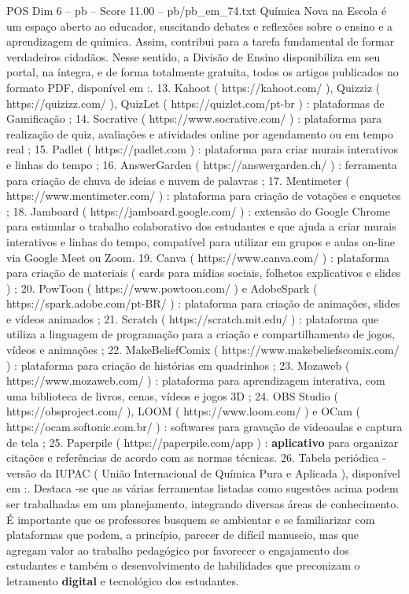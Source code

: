\begin{textsample}{POS Dim 6 – pb – Score 11.00 – pb/pb\_em\_74.txt}
Química Nova na Escola é um espaço aberto ao educador, suscitando debates e reflexões sobre o ensino e a aprendizagem de química.
Assim, contribui para a tarefa fundamental de formar verdadeiros cidadãos.
Nesse sentido, a Divisão de Ensino disponibiliza em seu portal, na íntegra, e de forma totalmente gratuita, todos os artigos publicados no formato PDF, disponível em :. 13.
Kahoot ( https://kahoot.com/ ), Quizziz ( https://quizizz.com/ ), QuizLet ( https://quizlet.com/pt-br ) : plataformas de Gamificação ; 14.
Socrative ( https://www.socrative.com/ ) : plataforma para realização de quiz, avaliações e atividades online por agendamento ou em tempo real ; 15.
Padlet ( https://padlet.com ) : plataforma para criar murais interativos e linhas do tempo ; 16.
AnswerGarden ( https://answergarden.ch/ ) : ferramenta para criação de chuva de ideias e nuvem de palavras ; 17.
Mentimeter ( https://www.mentimeter.com/ ) : plataforma para criação de votações e enquetes ; 18.
Jamboard ( https://jamboard.google.com/ ) : extensão do Google Chrome para estimular o trabalho colaborativo dos estudantes e que ajuda a criar murais interativos e linhas do tempo, compatível para utilizar em grupos e aulas on-line via Google Meet ou Zoom. 19.
Canva ( https://www.canva.com/ ) : plataforma para criação de materiais ( cards para mídias sociais, folhetos explicativos e slides ) ; 20.
PowToon ( https://www.powtoon.com/ ) e AdobeSpark ( https://spark.adobe.com/pt-BR/ ) : plataforma para criação de animações, slides e vídeos animados ; 21.
Scratch ( https://scratch.mit.edu/ ) : plataforma que utiliza a linguagem de programação para a criação e compartilhamento de jogos, vídeos e animações ; 22.
MakeBeliefComix ( https://www.makebeliefscomix.com/ ) : plataforma para criação de histórias em quadrinhos ; 23.
Mozaweb ( https://www.mozaweb.com/ ) : plataforma para aprendizagem interativa, com uma biblioteca de livros, cenas, vídeos e jogos 3D ; 24.
OBS Studio ( https://obsproject.com/ ), LOOM ( https://www.loom.com/ ) e OCam ( https://ocam.softonic.com.br/ ) : softwares para gravação de videoaulas e captura de tela ; 25.
Paperpile ( https://paperpile.com/app ) : \textbf{aplicativo} para organizar citações e referências de acordo com as normas técnicas. 26.
Tabela periódica - versão da IUPAC ( União Internacional de Química Pura e Aplicada ), disponível em :.
Destaca -se que as várias ferramentas listadas como sugestões acima podem ser trabalhadas em um planejamento, integrando diversas áreas de conhecimento.
É importante que os professores busquem se ambientar e se familiarizar com plataformas que podem, a princípio, parecer de difícil manuseio, mas que agregam valor ao trabalho pedagógico por favorecer o engajamento dos estudantes e também o desenvolvimento de habilidades que preconizam o letramento \textbf{digital} e tecnológico dos estudantes.

\end{textsample}
